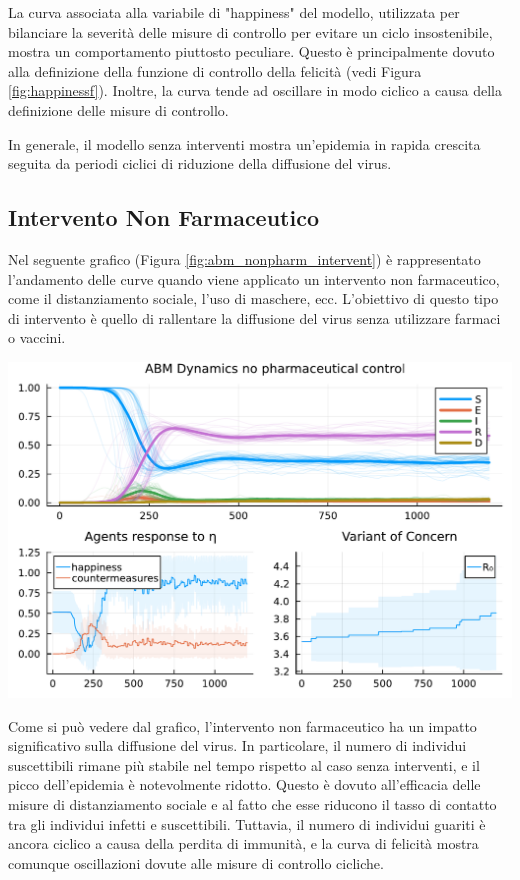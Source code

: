 La curva associata alla variabile di "happiness" del modello, 
utilizzata per bilanciare la severità delle misure di controllo 
per evitare un ciclo insostenibile, mostra un comportamento 
piuttosto peculiare. Questo è principalmente dovuto alla 
definizione della funzione di controllo della felicità 
(vedi Figura \ref{fig:happinessf}). Inoltre, la curva tende 
ad oscillare in modo ciclico a causa della definizione delle 
misure di controllo.

In generale, il modello senza interventi mostra un'epidemia in 
rapida crescita seguita da periodi ciclici di riduzione della 
diffusione del virus.

\subsection{Intervento Non Farmaceutico}

Nel seguente grafico (Figura \ref{fig:abm_nonpharm_intervent}) è 
rappresentato l'andamento delle curve quando viene applicato un 
intervento non farmaceutico, come il distanziamento sociale, 
l'uso di maschere, ecc. L'obiettivo di questo tipo di intervento 
è quello di rallentare la diffusione del virus senza utilizzare 
farmaci o vaccini.

\begin{minipage}{\linewidth}
    \centering
    \includegraphics[width=\textwidth]{img/SocialNetworkABM_CONTROL.pdf}
    \label{fig:abm_nonpharm_intervent}
\end{minipage}

Come si può vedere dal grafico, l'intervento non farmaceutico 
ha un impatto significativo sulla diffusione del virus. 
In particolare, il numero di individui suscettibili rimane 
più stabile nel tempo rispetto al caso senza interventi, e il 
picco dell'epidemia è notevolmente ridotto. Questo è dovuto 
all'efficacia delle misure di distanziamento sociale e al fatto 
che esse riducono il tasso di contatto tra gli individui infetti 
e suscettibili. Tuttavia, il numero di individui guariti è ancora 
ciclico a causa della perdita di immunità, e la curva di felicità 
mostra comunque oscillazioni dovute alle misure di controllo cicliche.

